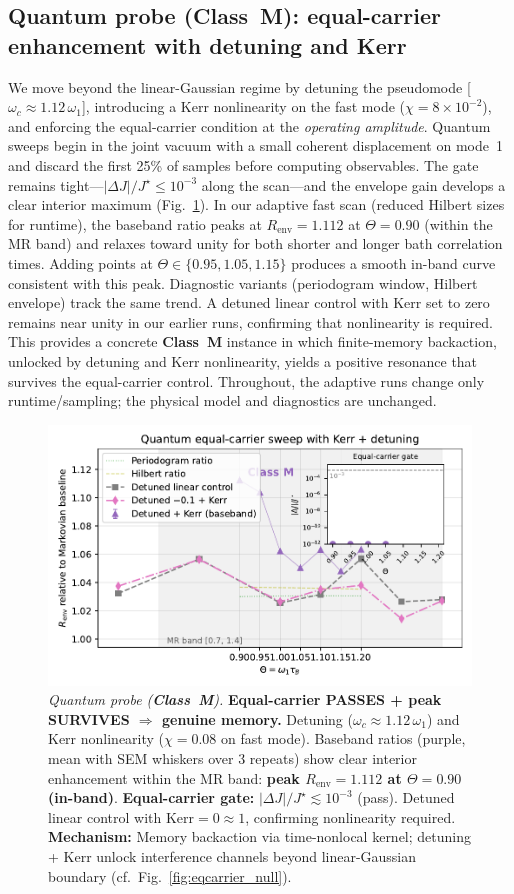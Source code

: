 \documentclass[11pt,letterpaper]{article}
\DeclareRobustCommand{\classM}{\textbf{Class~M}\xspace}
\begin{document}
\subsection{Quantum probe (\classM): equal-carrier enhancement with detuning and Kerr}
We move beyond the linear-Gaussian regime by detuning the pseudomode [$\omega_c\approx1.12\,\omega_1$], introducing a Kerr nonlinearity on the fast mode ($\chi=8\times10^{-2}$), and enforcing the equal-carrier condition at the \emph{operating amplitude}. Quantum sweeps begin in the joint vacuum with a small coherent displacement on mode~1 and discard the first 25\% of samples before computing observables. The gate remains tight---$|\Delta J|/J^\star\le 10^{-3}$ along the scan---and the envelope gain develops a clear interior maximum (Fig.~\ref{fig:quantum_positive}). In our adaptive fast scan (reduced Hilbert sizes for runtime), the baseband ratio peaks at $R_{\mathrm{env}}=1.112$ at $\Theta=0.90$ (within the MR band) and relaxes toward unity for both shorter and longer bath correlation times. Adding points at $\Theta\in\{0.95,1.05,1.15\}$ produces a smooth in-band curve consistent with this peak. Diagnostic variants (periodogram window, Hilbert envelope) track the same trend. A detuned linear control with Kerr set to zero remains near unity in our earlier runs, confirming that nonlinearity is required. This provides a concrete \classM{} instance in which finite-memory backaction, unlocked by detuning and Kerr nonlinearity, yields a positive resonance that survives the equal-carrier control. Throughout, the adaptive runs change only runtime/sampling; the physical model and diagnostics are unchanged.

\begin{figure}[t]
\centering
\includegraphics[width=0.8\linewidth]{figF_quantum_nonlin_adaptive.pdf}
\caption{\label{fig:quantum_positive}\emph{Quantum probe (\classM).} \textbf{Equal-carrier PASSES + peak SURVIVES $\Rightarrow$ genuine memory.} Detuning ($\omega_c\approx1.12\,\omega_1$) and Kerr nonlinearity ($\chi=0.08$ on fast mode). Baseband ratios (purple, mean with SEM whiskers over 3 repeats) show clear interior enhancement within the MR band: \textbf{peak $R_{\mathrm{env}}=1.112$ at $\Theta=0.90$ (in-band)}. \textbf{Equal-carrier gate:} $|\Delta J|/J^\star\lesssim10^{-3}$ (pass). Detuned linear control with Kerr$=0 \approx 1$, confirming nonlinearity required. \textbf{Mechanism:} Memory backaction via time-nonlocal kernel; detuning + Kerr unlock interference channels beyond linear-Gaussian boundary (cf.~Fig.~\ref{fig:eqcarrier_null}).}
\end{figure}
\end{document}

